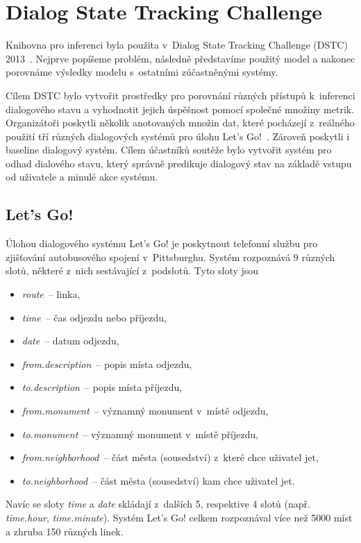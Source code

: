 \section{Dialog State Tracking Challenge}
\label{sec:dstc}

Knihovna pro inferenci byla použita v~Dialog State Tracking Challenge (DSTC) 2013~\cite{dstc2013}.
Nejprve popíšeme problém, následně představíme použitý model a nakonec porovnáme výsledky modelu s~ostatními zúčastněnými systémy.

Cílem DSTC bylo vytvořit prostředky pro porovnání různých přístupů k~inferenci dialogového stavu a vyhodnotit jejich úspěšnost pomocí společné množiny metrik.
Organizátoři poskytli několik anotovaných množin dat, které pocházejí z~reálného použití tří různých dialogových systémů pro úlohu Let's Go!~\cite{raux2005let}.
Zároveň poskytli i baseline dialogový systém.
Cílem účastníků soutěže bylo vytvořit systém pro odhad dialového stavu, který správně predikuje dialogový stav na základě vstupu od uživatele a minulé akce systému.

\subsection{Let's Go!}

Úlohou dialogového systému Let's Go! je poskytnout telefonní službu pro zjišťování autobusového spojení v~Pittsburghu.
Systém rozpoznává 9 různých slotů, některé z~nich sestávající z~podslotů.
Tyto sloty jsou
\begin{itemize}
\item \emph{route}~-- linka,
\item \emph{time}~-- čas odjezdu nebo příjezdu,
\item \emph{date}~-- datum odjezdu,
\item \emph{from.description}~-- popis místa odjezdu,
\item \emph{to.description}~-- popis místa příjezdu,
\item \emph{from.monument}~-- významný monument v~místě odjezdu,
\item \emph{to.monument}~-- významný monument v~místě příjezdu,
\item \emph{from.neighborhood}~-- část města (sousedství) z~které chce uživatel jet,
\item \emph{to.neighborhood}~-- část města (sousedství) kam chce uživatel jet.
\end{itemize}
Navíc se sloty \emph{time} a \emph{date} skládají z~dalších 5, respektive 4 slotů (např. \emph{time.hour}, \emph{time.minute}).
Systém Let's Go! celkem rozpoznával více než 5000 míst a zhruba 150 různých linek.

